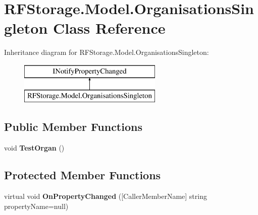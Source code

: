 \hypertarget{class_r_f_storage_1_1_model_1_1_organisations_singleton}{}\section{R\+F\+Storage.\+Model.\+Organisations\+Singleton Class Reference}
\label{class_r_f_storage_1_1_model_1_1_organisations_singleton}
Inheritance diagram for R\+F\+Storage.\+Model.\+Organisations\+Singleton\+:\begin{figure}[H]
\begin{center}
\leavevmode
\includegraphics[height=2.000000cm]{class_r_f_storage_1_1_model_1_1_organisations_singleton}
\end{center}
\end{figure}
\subsection*{Public Member Functions}
\begin{DoxyCompactItemize}
\item 
\mbox{\label{class_r_f_storage_1_1_model_1_1_organisations_singleton_a63e52d0172e288a8b7eae8abd0c2acfd}} 
void {\bfseries Test\+Organ} ()
\end{DoxyCompactItemize}
\subsection*{Protected Member Functions}
\begin{DoxyCompactItemize}
\item 
\mbox{\label{class_r_f_storage_1_1_model_1_1_organisations_singleton_a845177f73909cfe84c4656405a25d6d0}} 
virtual void {\bfseries On\+Property\+Changed} (\mbox{[}Caller\+Member\+Name\mbox{]} string property\+Name=null)
\end{DoxyCompactItemize}
